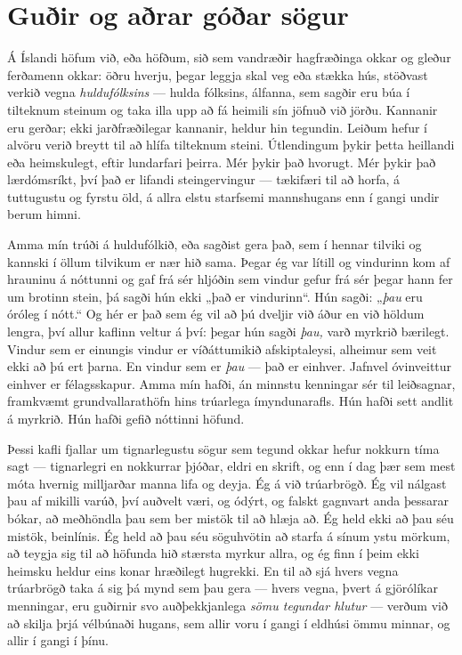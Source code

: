 \chapter{Guðir og aðrar góðar sögur}

Á Íslandi höfum við, eða höfðum, sið sem vandræðir hagfræðinga okkar og gleður ferðamenn okkar: öðru hverju, þegar leggja skal veg eða stækka hús, stöðvast verkið vegna \emph{huldufólksins} — hulda fólksins, álfanna, sem sagðir eru búa í tilteknum steinum og taka illa upp að fá heimili sín jöfnuð við jörðu. Kannanir eru gerðar; ekki jarðfræðilegar kannanir, heldur hin tegundin. Leiðum hefur í alvöru verið breytt til að hlífa tilteknum steini. Útlendingum þykir þetta heillandi eða heimskulegt, eftir lundarfari þeirra. Mér þykir það hvorugt. Mér þykir það lærdómsríkt, því það er lifandi steingervingur — tækifæri til að horfa, á tuttugustu og fyrstu öld, á allra elstu starfsemi mannshugans enn í gangi undir berum himni.

Amma mín trúði á huldufólkið, eða sagðist gera það, sem í hennar tilviki og kannski í öllum tilvikum er nær hið sama. Þegar ég var lítill og vindurinn kom af hrauninu á nóttunni og gaf frá sér hljóðin sem vindur gefur frá sér þegar hann fer um brotinn stein, þá sagði hún ekki „það er vindurinn“. Hún sagði: „\emph{þau} eru óróleg í nótt.“ Og hér er það sem ég vil að þú dveljir við áður en við höldum lengra, því allur kaflinn veltur á því: þegar hún sagði \emph{þau,} varð myrkrið bærilegt. Vindur sem er einungis vindur er víðáttumikið afskiptaleysi, alheimur sem veit ekki að þú ert þarna. En vindur sem er \emph{þau} — það er einhver. Jafnvel óvinveittur einhver er félagsskapur. Amma mín hafði, án minnstu kenningar sér til leiðsagnar, framkvæmt grundvallarathöfn hins trúarlega ímyndunarafls. Hún hafði sett andlit á myrkrið. Hún hafði gefið nóttinni höfund.

Þessi kafli fjallar um tignarlegustu sögur sem tegund okkar hefur nokkurn tíma sagt — tignarlegri en nokkurrar þjóðar, eldri en skrift, og enn í dag þær sem mest móta hvernig milljarðar manna lifa og deyja. Ég á við trúarbrögð. Ég vil nálgast þau af mikilli varúð, því auðvelt væri, og ódýrt, og falskt gagnvart anda þessarar bókar, að meðhöndla þau sem ber mistök til að hlæja að. Ég held ekki að þau séu mistök, beinlínis. Ég held að þau séu söguhvötin að starfa á sínum ystu mörkum, að teygja sig til að höfunda hið stærsta myrkur allra, og ég finn í þeim ekki heimsku heldur eins konar hræðilegt hugrekki. En til að sjá hvers vegna trúarbrögð taka á sig þá mynd sem þau gera — hvers vegna, þvert á gjörólíkar menningar, eru guðirnir svo auðþekkjanlega \emph{sömu tegundar hlutur} — verðum við að skilja þrjá vélbúnaði hugans, sem allir voru í gangi í eldhúsi ömmu minnar, og allir í gangi í þínu.

